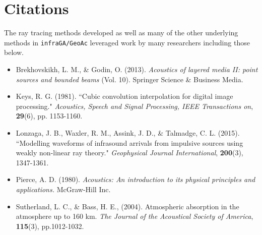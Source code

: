 \documentclass[10pt]{article}
\begin{document}
\section{Citations}
The ray tracing methods developed as well as many of the other underlying methods in \verb=infraGA/GeoAc= leveraged work by many researchers including those below.
\begin{itemize}
  \item Brekhovskikh, L. M., \& Godin, O. (2013).  \textit{Acoustics of layered media II: point sources and bounded beams} (Vol. 10). Springer Science \& Business Media.
  \item Keys, R. G. (1981). ``Cubic convolution interpolation for digital image processing." \textit{Acoustics, Speech and Signal Processing, IEEE Transactions on}, \textbf{29}(6), pp. 1153-1160.
  \item Lonzaga, J. B., Waxler, R. M., Assink, J. D., \& Talmadge, C. L. (2015). ``Modelling waveforms of infrasound arrivals from impulsive sources using weakly non-linear ray theory." \textit{Geophysical Journal International}, \textbf{200}(3), 1347-1361.
  \item Pierce, A. D. (1980).  \textit{Acoustics: An introduction to its physical principles and applications.}  McGraw-Hill Inc. 

  \item Sutherland, L. C., \& Bass, H. E., (2004). Atmospheric absorption in the atmosphere up to 160 km. \textit{The Journal of the Acoustical Society of America}, \textbf{115}(3), pp.1012-1032.

 \end{itemize}
\end{document}

